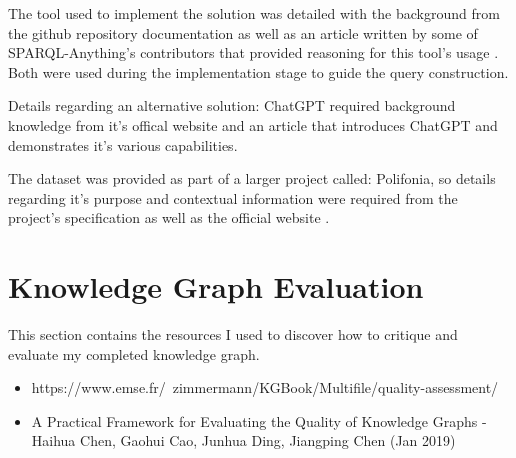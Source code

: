 The tool used to implement the solution was detailed with the background from the github repository documentation \cite{sparqlanythinggithub} as well as an article written by some of SPARQL-Anything's contributors that provided reasoning for this tool's usage \cite{sparqlanything}. Both were used during the implementation stage to guide the query construction. 

Details regarding an alternative solution: ChatGPT required background knowledge from it's offical website \cite{chatgptwebsite} and an article that introduces ChatGPT and demonstrates it's various capabilities\cite{chatgpt}. 

The dataset was provided as part of a larger project called: Polifonia, so details regarding it's purpose and contextual information were required from the project's specification \cite{polifoniaproject} as well as the official website \cite{polifonia}. 

\section{Knowledge Graph Evaluation}
\hspace{0.5cm} This section contains the resources I used to discover how to critique and evaluate my completed knowledge graph. 
\begin{itemize}
\item https://www.emse.fr/~zimmermann/KGBook/Multifile/quality-assessment/
\item A Practical Framework for Evaluating the Quality of Knowledge Graphs - Haihua Chen, Gaohui Cao, Junhua Ding, Jiangping Chen (Jan 2019)
\end{itemize}
